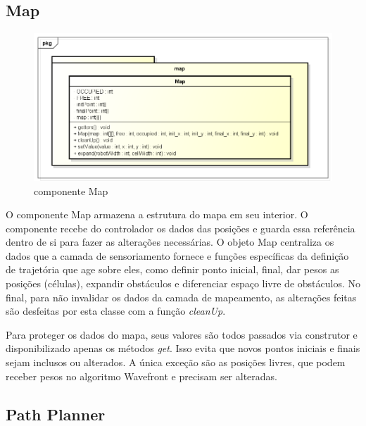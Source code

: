 \subsection{Map}

\begin{figure}[h]
	\centering
	\label{fig24}
		\includegraphics[keepaspectratio=true,scale=0.5]{figuras/pkgmap.png}
	\caption{componente Map}
\end{figure}

O componente Map armazena a estrutura do mapa em seu interior. O componente recebe do controlador os dados das posições e guarda essa referência dentro de si para fazer as alterações necessárias. O objeto Map centraliza os dados que a camada de sensoriamento fornece e funções específicas da definição de trajetória que age sobre eles, como definir ponto inicial, final, dar pesos as posições (células), expandir obstáculos e diferenciar espaço livre de obstáculos. No final, para não invalidar os dados da camada de mapeamento, as alterações feitas são desfeitas por esta classe com a função \textit{cleanUp}.

Para proteger os dados do mapa, seus valores são todos passados via construtor e disponibilizado apenas os métodos \textit{get}. Isso evita que novos pontos iniciais e finais sejam inclusos ou alterados. A única exceção são as posições livres, que podem receber pesos no algoritmo Wavefront e precisam ser alteradas.

\subsection{Path Planner}

